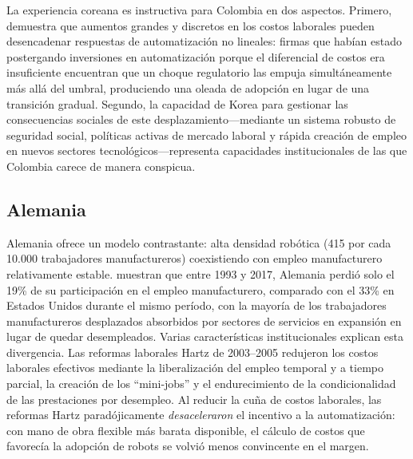 \documentclass{article}
\begin{document}
La experiencia coreana es instructiva para Colombia en dos aspectos. Primero, demuestra que aumentos grandes y discretos en los costos laborales pueden desencadenar respuestas de automatizaci\'on no lineales: firmas que hab\'ian estado postergando inversiones en automatizaci\'on porque el diferencial de costos era insuficiente encuentran que un choque regulatorio las empuja simult\'aneamente m\'as all\'a del umbral, produciendo una oleada de adopci\'on en lugar de una transici\'on gradual. Segundo, la capacidad de Korea para gestionar las consecuencias sociales de este desplazamiento---mediante un sistema robusto de seguridad social, pol\'iticas activas de mercado laboral y r\'apida creaci\'on de empleo en nuevos sectores tecnol\'ogicos---representa capacidades institucionales de las que Colombia carece de manera conspicua.

\subsection{Alemania}
\label{subsec:germany}

Alemania ofrece un modelo contrastante: alta densidad rob\'otica (415 por cada 10.000 trabajadores manufactureros) coexistiendo con empleo manufacturero relativamente estable. \cite{dauth2021} muestran que entre 1993 y 2017, Alemania perdi\'o solo el 19\% de su participaci\'on en el empleo manufacturero, comparado con el 33\% en Estados Unidos durante el mismo per\'iodo, con la mayor\'ia de los trabajadores manufactureros desplazados absorbidos por sectores de servicios en expansi\'on en lugar de quedar desempleados. Varias caracter\'isticas institucionales explican esta divergencia. Las reformas laborales Hartz de 2003--2005 redujeron los costos laborales efectivos mediante la liberalizaci\'on del empleo temporal y a tiempo parcial, la creaci\'on de los ``mini-jobs'' y el endurecimiento de la condicionalidad de las prestaciones por desempleo. Al reducir la cu\~na de costos laborales, las reformas Hartz parad\'ojicamente \textit{desaceleraron} el incentivo a la automatizaci\'on: con mano de obra flexible m\'as barata disponible, el c\'alculo de costos que favorec\'ia la adopci\'on de robots se volvi\'o menos convincente en el margen.
\end{document}

